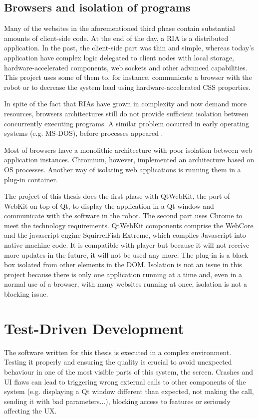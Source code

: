 \subsection{Browsers and isolation of programs}    
Many of the websites in the aforementioned third phase contain substantial amounts of client-side code. 
At the end of the day, a \ac{RIA} is a distributed application. 
In the past, the client-side part was thin and simple, whereas today's application have complex logic delegated to client nodes with local storage, hardware-accelerated components, web sockets and other advanced capabilities.
This project uses some of them to, for instance, communicate a browser with the robot or to decrease the system load using hardware-accelerated \ac{CSS} properties.

In spite of the fact that \acp{RIA} have grown in complexity and now demand more resources, browsers architectures still do not provide sufficient isolation between concurrently executing programs.
A similar problem occurred in early operating systems (e.g. MS-DOS), before processes appeared \cite{Reis:2009}. 

Most of browsers have a monolithic architecture with poor isolation between web application instances. Chromium, however, implemented an architecture based on \ac{OS} processes. 
Another way of isolating web applications is running them in a plug-in container. 

The project of this thesis does the first phase with QtWebKit, the port of WebKit on top of Qt, to display the application in a Qt window and communicate with the software in the robot. 
The second part uses Chrome to meet the technology requirements.
QtWebKit components comprise the WebCore and the javascript engine SquirrelFish Extreme, which compiles Javascript into native machine code. 
It is compatible with \flash player but because it will not receive more updates in the future, it will not be used any more.
The \flash plug-in is a black box isolated from other elements in the \ac{DOM}.
Isolation is not an issue in this project because there is only one application running at a time and, even in a normal use of a browser, with many websites running at once, isolation is not a blocking issue.


\section{Test-Driven Development}
\label{sec:testdrivendev}
The software written for this thesis is executed in a complex environment.
Testing it properly and ensuring the quality is crucial to avoid unexpected behaviour in one of the most visible parts of this system, the screen.
Crashes and \ac{UI} flaws can lead to triggering wrong external calls to other components of the system (e.g. displaying a Qt window different than expected, not making the call, sending it with bad parameters...), blocking access to features or seriously affecting the \ac{UX}.


